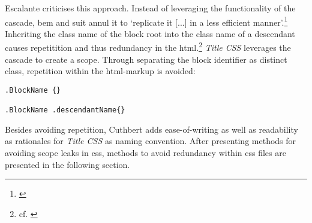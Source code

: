Escalante criticises this approach.
Instead of leveraging the functionality of the cascade, \gls{bem} and \gls{suit} annul it to `replicate it [...] in a less efficient manner'.\footnote{\cite{mpgcss}}
Inheriting the class name of the block root into the class name of a descendant causes repetitition and thus redundancy in the \gls{html}.\footnote{cf. \cite{mpgcss}}
{\slshape Title CSS} leverages the cascade to create a scope.
Through separating the block identifier as distinct class, repetition within the \gls{html}-markup is avoided:

\begin{verbatim}
.BlockName {}

.BlockName .descendantName{}
\end{verbatim}
Besides avoiding repetition, Cuthbert adds ease-of-writing as well as readability as rationales for {\slshape Title CSS} as naming convention.
After presenting methods for avoiding scope leaks in \gls{css}, methods to avoid redundancy within \gls{css} files are presented in the following section.

